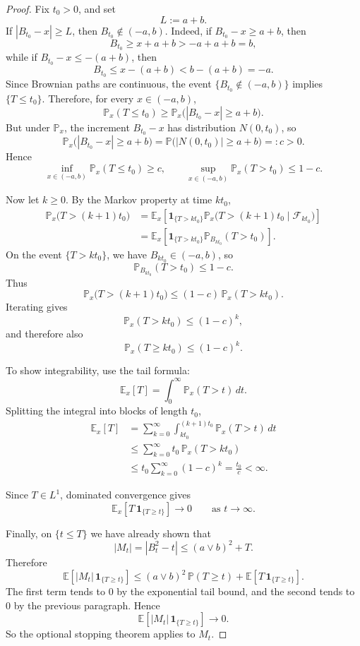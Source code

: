 \documentclass[11pt]{article}
\theoremstyle{definition}
\begin{document}
\begin{proof}
Fix \(t_0>0\), and set
\[
L:=a+b.
\]
If \(|B_{t_0}-x|\ge L\), then \(B_{t_0}\notin(-a,b)\). Indeed, if \(B_{t_0}-x\ge a+b\), then
\[
B_{t_0}\ge x+a+b>-a+a+b=b,
\]
while if \(B_{t_0}-x\le -(a+b)\), then
\[
B_{t_0}\le x-(a+b)< b-(a+b)=-a.
\]
Since Brownian paths are continuous, the event \(\{B_{t_0}\notin(-a,b)\}\) implies \(\{T\le t_0\}\). Therefore, for every \(x\in(-a,b)\),
\[
\mathbb P_x(T\le t_0)
\ge
\mathbb P_x\bigl(|B_{t_0}-x|\ge a+b\bigr).
\]
But under \(\mathbb P_x\), the increment \(B_{t_0}-x\) has distribution \(N(0,t_0)\), so
\[
\mathbb P_x\bigl(|B_{t_0}-x|\ge a+b\bigr)
=
\mathbb P\bigl(|N(0,t_0)|\ge a+b\bigr)
=:c>0.
\]
Hence
\[
\inf_{x\in(-a,b)}\mathbb P_x(T\le t_0)\ge c,
\qquad
\sup_{x\in(-a,b)}\mathbb P_x(T> t_0)\le 1-c.
\]

Now let \(k\ge 0\). By the Markov property at time \(k t_0\),
\begin{align*}
\mathbb P_x\bigl(T>(k+1)t_0\bigr)
&=
\mathbb E_x\!\left[
\mathbf 1_{\{T>k t_0\}}
\mathbb P_x\bigl(T>(k+1)t_0 \mid \mathcal F_{k t_0}\bigr)
\right] \\
&=
\mathbb E_x\!\left[
\mathbf 1_{\{T>k t_0\}}
\mathbb P_{B_{k t_0}}(T>t_0)
\right].
\end{align*}
On the event \(\{T>k t_0\}\), we have \(B_{k t_0}\in(-a,b)\), so
\[
\mathbb P_{B_{k t_0}}(T>t_0)\le 1-c.
\]
Thus
\[
\mathbb P_x\bigl(T>(k+1)t_0\bigr)
\le
(1-c)\,\mathbb P_x(T>k t_0).
\]
Iterating gives
\[
\mathbb P_x(T>k t_0)\le (1-c)^k,
\]
and therefore also
\[
\mathbb P_x(T\ge k t_0)\le (1-c)^k.
\]

To show integrability, use the tail formula:
\[
\mathbb E_x[T]
=
\int_0^\infty \mathbb P_x(T>t)\,dt.
\]
Splitting the integral into blocks of length \(t_0\),
\begin{align*}
\mathbb E_x[T]
&=
\sum_{k=0}^\infty \int_{k t_0}^{(k+1)t_0}\mathbb P_x(T>t)\,dt \\
&\le
\sum_{k=0}^\infty t_0\,\mathbb P_x(T>k t_0) \\
&\le
t_0\sum_{k=0}^\infty (1-c)^k
=
\frac{t_0}{c}
<\infty.
\end{align*}

Since \(T\in L^1\), dominated convergence gives
\[
\mathbb E_x\!\left[T\,\mathbf 1_{\{T\ge t\}}\right]\to 0
\qquad \text{as } t\to\infty.
\]

Finally, on \(\{t\le T\}\) we have already shown that
\[
|M_t|
=
|B_t^2-t|
\le
(a\vee b)^2+T.
\]
Therefore
\[
\mathbb E\!\left[|M_t|\,\mathbf 1_{\{T\ge t\}}\right]
\le
(a\vee b)^2\,\mathbb P(T\ge t)
+
\mathbb E\!\left[T\,\mathbf 1_{\{T\ge t\}}\right].
\]
The first term tends to \(0\) by the exponential tail bound, and the second tends to \(0\) by the previous paragraph. Hence
\[
\mathbb E\!\left[|M_t|\,\mathbf 1_{\{T\ge t\}}\right]\to 0.
\]
So the optional stopping theorem applies to \(M_t\).
\end{proof}
\end{document}
